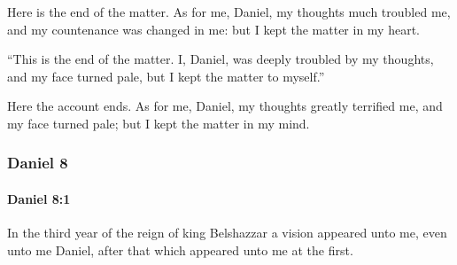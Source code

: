 			\begin{versebox}
					\item[BHS] 
					\item[LXX] 
					\item[ASV] Here is the end of the matter. As for me, Daniel, my thoughts much troubled me, and my countenance was changed in me: but I kept the matter in my heart.
					\item[NIV] “This is the end of the matter. I, Daniel, was deeply troubled by my thoughts, and my face turned pale, but I kept the matter to myself.”
					\item[NRSV] Here the account ends. As for me, Daniel, my thoughts greatly terrified me, and my face turned pale; but I kept the matter in my mind.
			\end{versebox}
	\subsubsection{Daniel 8} %
		\label{DANIEL-8}

		\paragraph{Daniel 8:1} %
			\label{DANIEL-8-1}

			In the third year of the reign of king Belshazzar a vision appeared unto me, even unto me Daniel, after that which appeared unto me at the first.

